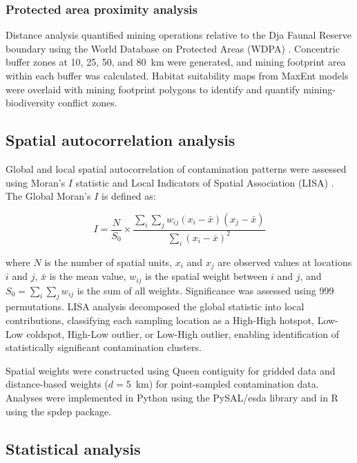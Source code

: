\documentclass[preprint,12pt,authoryear]{elsarticle}
\begin{document}
\subsubsection{Protected area proximity analysis}

Distance analysis quantified mining operations relative to the Dja Faunal Reserve boundary using the World Database on Protected Areas (WDPA) \citep{UNEPWCMC2024}. Concentric buffer zones at 10, 25, 50, and 80~km were generated, and mining footprint area within each buffer was calculated. Habitat suitability maps from MaxEnt models were overlaid with mining footprint polygons to identify and quantify mining-biodiversity conflict zones.


\subsection{Spatial autocorrelation analysis}

Global and local spatial autocorrelation of contamination patterns were assessed using Moran's $I$ statistic \citep{Moran1950} and Local Indicators of Spatial Association (LISA) \citep{Anselin1995}. The Global Moran's $I$ is defined as:

\begin{equation}
I = \frac{N}{S_0} \times \frac{\sum_i \sum_j w_{ij}(x_i - \bar{x})(x_j - \bar{x})}{\sum_i (x_i - \bar{x})^2}
\label{eq:moran}
\end{equation}

\noindent where $N$ is the number of spatial units, $x_i$ and $x_j$ are observed values at locations $i$ and $j$, $\bar{x}$ is the mean value, $w_{ij}$ is the spatial weight between $i$ and $j$, and $S_0 = \sum_i \sum_j w_{ij}$ is the sum of all weights. Significance was assessed using 999 permutations. LISA analysis decomposed the global statistic into local contributions, classifying each sampling location as a High-High hotspot, Low-Low coldspot, High-Low outlier, or Low-High outlier, enabling identification of statistically significant contamination clusters.

Spatial weights were constructed using Queen contiguity for gridded data and distance-based weights ($d = 5$~km) for point-sampled contamination data. Analyses were implemented in Python using the PySAL/esda library and in R using the spdep package.


\subsection{Statistical analysis}
\end{document}
